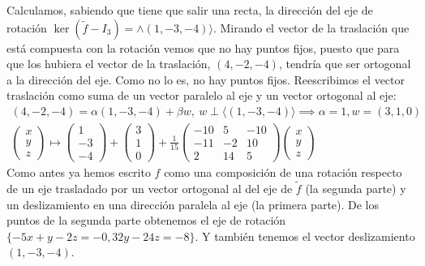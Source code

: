 \documentclass[14pt]{book}
\begin{document}
\begin{ej}
	Calculamos, sabiendo que tiene que salir una recta, la dirección del eje de rotación $\ker (\tilde{f} - I_3) = \land (1, -3, -4)\rangle$. Mirando el vector de la traslación que está compuesta con la rotación vemos que no hay puntos fijos, puesto que para que los hubiera el vector de la traslación, $(4, -2, -4)$, tendría que ser ortogonal a la dirección del eje. Como no lo es, no hay puntos fijos. Reescribimos el vector traslación como suma de un vector paralelo al eje y un vector ortogonal al eje:
	\begin{align*}
		(4, -2, -4) = \alpha(1, -3, -4) + \beta w,\ w \perp \langle (1, -3, -4) \rangle \implies \alpha = 1, w = (3, 1, 0) \\
		\left(\begin{array}{c}
		x \\ y \\ z
		\end{array}\right) \mapsto
		\left(\begin{array}{c}
		1 \\ -3 \\ -4
		\end{array}\right) +
		\left(\begin{array}{c}
		3 \\ 1 \\ 0
		\end{array}\right) + 
		\frac{1}{15}
		\left(\begin{array}{ccc}
		-10 & 5 & -10 \\
		-11 & -2 & 10 \\
		2 & 14 & 5
		\end{array}\right)\left(\begin{array}{c}
		x \\ y \\ z
		\end{array}\right)
	\end{align*}
	Como antes ya hemos escrito $f$ como una composición de una rotación respecto de un eje trasladado por un vector ortogonal al del eje de $\tilde{f}$ (la segunda parte) y un deslizamiento en una dirección paralela al eje (la primera parte). De los puntos de la segunda parte obtenemos el eje de rotación $\{ -5x + y - 2z = -0, 32y - 24z = -8 \}$. Y también tenemos el vector deslizamiento $(1, -3, -4)$.
	

\end{ej}
\end{document}
